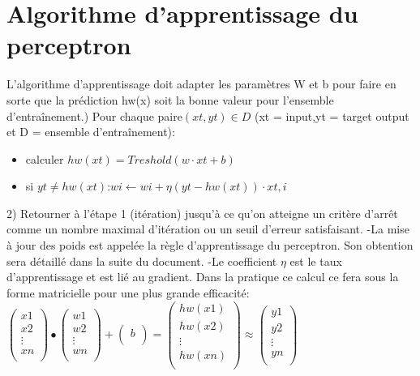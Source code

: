 \documentclass[openany,14pt,fleqn]{book} %
\begin{document}
\section{Algorithme d'apprentissage du perceptron}
L'algorithme d'apprentissage doit adapter les paramètres W et b pour faire en sorte que la prédiction hw(x) soit la bonne valeur pour l'ensemble d'entraînement.\newline{}) Pour chaque paire$(xt,yt)\in D$ (xt = input,yt = target output et D = ensemble d'entraînement):\newline
\begin{itemize}\item calculer $hw(xt)=Treshold(w\cdot xt+b)$\newline
\item si $yt\neq hw(xt)$:$wi\leftarrow wi+\eta (yt-hw(xt))\cdot xt,i$\newline \end{itemize}
2) Retourner à l'étape 1 (itération) jusqu'à ce qu'on atteigne un critère d'arrêt comme un nombre maximal d'itération ou un seuil d'erreur satisfaisant.\newline
-La mise à jour des poids est appelée la règle d'apprentissage du perceptron. Son obtention sera détaillé dans la suite du document.\newline
-Le coefficient $\eta$ est le taux d'apprentissage et est lié au gradient.\newline
Dans la pratique ce calcul ce fera sous la forme matricielle pour une plus grande efficacité:\newline\smallbreak
$\begin{pmatrix} x1\\x2\\\vdots\\xn\\\end{pmatrix}\bullet \begin{pmatrix} w1\\w2\\\vdots\\wn\\\end{pmatrix}+\begin{pmatrix}
b\\\end{pmatrix}=\begin{pmatrix}hw(x1)\\hw(x2)\\\vdots\\hw(xn)\\\end{pmatrix}\approx\begin{pmatrix} y1\\y2\\\vdots\\yn\\\end{pmatrix}$
\end{document}
